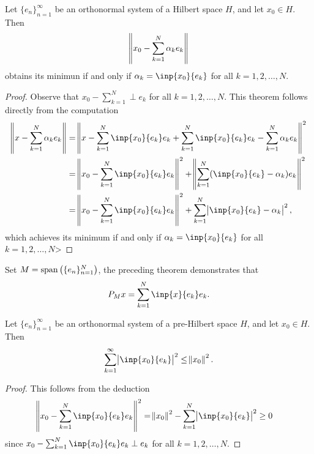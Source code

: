 \begin{thm}
\label{thm:hilbert_spaces:orthogonal_projection}
Let $\{ e_n \}_{n=1}^{\infty}$ be an orthonormal system of a Hilbert space 
$H$, and let $x_0 \in H$. 
Then 
\begin{equation*}
    \norm{x_0 - \sum_{k=1}^{N} \alpha_k e_k}
\end{equation*}
obtains its minimun if and only if $\alpha_k = \inp{x_0}{e_k}$ for all $k = 
1, 2, \ldots, N$. 
\end{thm}
\begin{proof}
Observe that $x_0 - \sum_{k=1}^{N} \perp e_k$ for all $k = 1, 2, \ldots, N$. 
This theorem follows directly from the computation 
\begin{equation*}
    \begin{aligned}
        \norm{x - \sum_{k=1}^{N} \alpha_k e_k} 
        &= \norm{x - \sum_{k=1}^{N} \inp{x_0}{e_k} e_k 
            + \sum_{k=1}^{N} \inp{x_0}{e_k} e_k 
            - \sum_{k=1}^{N} \alpha_k e_k}^2 \\
        &= \norm{x_0 - \sum_{k=1}^{N} \inp{x_0}{e_k} e_k}^2
            + \norm{\sum_{k=1}^{N} (\inp{x_0}{e_k} - \alpha_k) e_k}^2 \\
        &= \norm{x_0 - \sum_{k=1}^{N} \inp{x_0}{e_k} e_k}^2 
            + \sum_{k=1}^{N} \abs{\inp{x_0}{e_k} - \alpha_k}^2, 
    \end{aligned}
\end{equation*}
which achieves its minimum if and only if $\alpha_k = \inp{x_0}{e_k}$ for 
all $k = 1, 2, \ldots, N$> 
\end{proof}

Set $M = \operatorname{span}\left( \{ e_n \}_{n=1}^{N} \right)$, the preceding theorem 
demonstrates that 
\begin{equation*}
    P_M x = \sum_{k=1}^{N} \inp{x}{e_k} e_k.
\end{equation*}

\begin{cor}
Let $\{ e_n \}_{n=1}^{\infty}$ be an orthonormal system of a pre-Hilbert 
space $H$, and let $x_0 \in H$. 
Then 
\begin{equation*}
    \sum_{k=1}^{\infty} \abs{\inp{x_0}{e_k}}^2 \le \norm{x_0}^2. 
\end{equation*}
\end{cor}
\begin{proof}
This follows from the deduction 
\begin{equation*}
    \begin{aligned}
        \norm{x_0 - \sum_{k=1}^{N} \inp{x_0}{e_k} e_k} ^2
        &= \norm{x_0}^2 - \sum_{k=1}^{N} \abs{\inp{x_0}{e_k}}^2 \ge 0
    \end{aligned}
\end{equation*}
since $x_0 - \sum_{k=1}^{N} \inp{x_0}{e_k} e_k \perp e_k$ for all $k = 1, 2, 
\ldots, N$. 
\end{proof}

